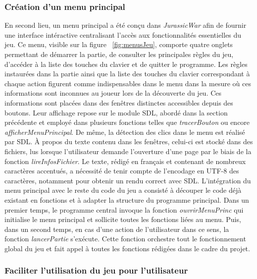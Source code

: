 \documentclass[11pt,a4paper]{article}
\begin{document}
\subsubsection{Création d'un menu principal}
En second lieu, un menu principal a été conçu dans \textit{\mbox{JurassicWar}} afin de fournir une interface intéractive centralisant l'accès aux fonctionnalités essentielles du jeu.  Ce menu, visible sur la figure ~\ref{fig:menusJeu}, comporte quatre onglets permettant de démarrer la partie, de consulter les principales règles du jeu, d'accéder à  la liste des touches du clavier et de quitter le programme. Les règles instaurées dans la partie ainsi que la liste des touches du clavier correspondant à chaque action figurent comme indispensables dans le menu dans la mesure où ces informations sont inconnues au joueur lors de la découverte du jeu. Ces informations sont placées dans des fenêtres distinctes accessibles depuis des boutons. Leur affichage repose sur le module SDL, abordé dans la section précédente et employé dans plusieurs fonctions telles que \textit{\mbox{tracerBouton}} ou encore \textit{\mbox{afficherMenuPrincipal}}. De même, la détection des clics dans le menu est réalisé par SDL. À propos du texte contenu dans les fenêtres, celui-ci est stocké dans des fichiers, lus lorsque l'utilisateur demande l'ouverture d'une page par le biais de la fonction \textit{\mbox{lireInfosFichier}}. Le texte, rédigé en français et contenant de nombreux caractères accentués, a nécessité de tenir compte de l'encodage en UTF-8 des caractères, notamment pour obtenir un rendu correct avec SDL. L'intégration du menu principal avec le reste du code du jeu a consisté à découper le code déjà existant en fonctions et à adapter la structure du programme principal. Dans un premier temps, le programme central invoque la fonction \textit{\mbox{ouvrirMenuPrinc}} qui initialise le menu principal et sollicite toutes les fonctions liées au menu. Puis, dans un second temps, en cas d'une action de l'utilisateur dans ce sens, la fonction \textit{\mbox{lancerPartie}} s'exécute. Cette fonction orchestre tout le fonctionnement global du jeu et fait appel à toutes les fonctions rédigées dans le cadre du projet.

\subsubsection{Faciliter l’utilisation du jeu pour l’utilisateur}
\end{document}
